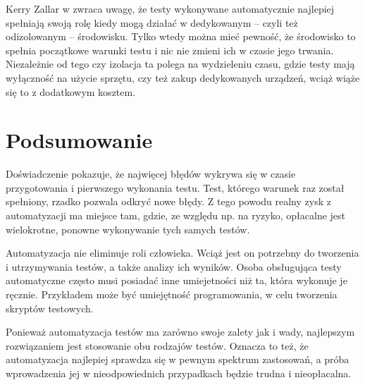 \documentclass[00-praca-magisterska.tex]{subfiles}
\begin{document}
Kerry Zallar w \cite{practical-automated} zwraca uwagę, że testy wykonywane
automatycznie najlepiej spełniają swoją rolę kiedy mogą działać w dedykowanym
-- czyli też odizolowanym -- środowisku. Tylko wtedy można mieć pewność, że
środowisko to spełnia początkowe warunki testu i nic nie zmieni ich w czasie
jego trwania. Niezależnie od tego czy izolacja ta polega na wydzieleniu czasu,
gdzie testy mają wyłączność na użycie sprzętu, czy też zakup dedykowanych
urządzeń, wciąż wiąże się to z dodatkowym kosztem.

\section{Podsumowanie}
\label{automatyzacja-podsumowanie}

Doświadczenie pokazuje, że najwięcej błędów wykrywa się w czasie
przygotowania i pierwszego wykonania testu. Test, którego warunek raz został
spełniony, rzadko pozwala odkryć nowe błędy. Z tego powodu realny zysk z
automatyzacji ma miejsce tam, gdzie, ze względu np. na ryzyko, opłacalne jest
wielokrotne, ponowne wykonywanie tych samych testów.

Automatyzacja nie eliminuje roli człowieka. Wciąż jest on potrzebny do
tworzenia i utrzymywania testów, a także analizy ich wyników. Osoba obsługująca
testy automatyczne często musi posiadać inne umiejetności niż ta, która
wykonuje je ręcznie. Przykładem może być umiejętność programowania, w celu
tworzenia skryptów testowych.

Ponieważ automatyzacja testów ma zarówno swoje zalety jak i wady, najlepszym
rozwiązaniem jest stosowanie obu rodzajów testów. Oznacza to też, że
automatyzacja najlepiej sprawdza się w pewnym spektrum zastosowań, a próba
wprowadzenia jej w nieodpowiednich przypadkach będzie trudna i nieopłacalna.
\end{document}

